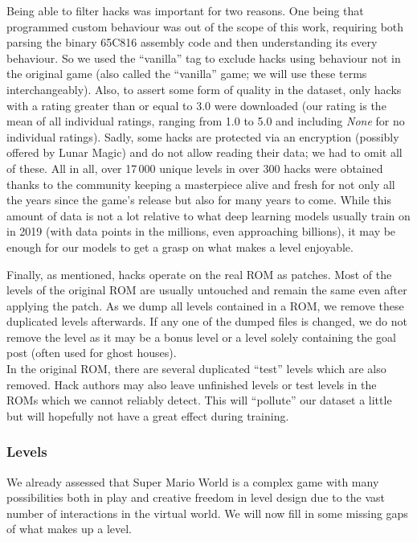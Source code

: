 Being able to filter hacks was important for two reasons. One being
that programmed custom behaviour was out of the scope of this work,
requiring both parsing the binary 65C816 assembly code and then
understanding its every behaviour. So we used the ``vanilla'' tag to
exclude hacks using behaviour not in the original game (also called
the ``vanilla'' game; we will use these terms interchangeably). Also,
to assert some form of quality in the dataset, only hacks with a
rating greater than or equal to 3.0 were downloaded (our rating is the
mean of all individual ratings, ranging from 1.0 to 5.0 and including
\emph{None} for no individual ratings). Sadly, some hacks are
protected via an encryption (possibly offered by Lunar Magic) and do
not allow reading their data; we had to omit all of these. All in all,
over 17\,000 unique levels in over 300 hacks were obtained thanks to
the community keeping a masterpiece alive and fresh for not only all
the years since the game's release but also for many years to come.
While this amount of data is not a lot relative to what deep learning
models usually train on in 2019 (with data points in the millions,
even approaching billions), it may be enough for our models to get a
grasp on what makes a level enjoyable.

Finally, as mentioned, hacks operate on the real ROM as patches. Most
of the levels of the original ROM are usually untouched and remain the
same even after applying the patch. As we dump all levels contained in
a ROM, we remove these duplicated levels afterwards. If any one of the
dumped files is changed, we do not remove the level as it may be a
bonus level or a level solely containing the goal post (often used for
ghost houses). \\
In the original ROM, there are several duplicated ``test'' levels
which are also removed. Hack authors may also leave unfinished levels
or test levels in the ROMs which we cannot reliably detect. This will
``pollute'' our dataset a little but will hopefully not have a great
effect during training.

\subsubsection{Levels}
\label{sec:levels}

We already assessed that Super Mario World is a complex game with many
possibilities both in play and creative freedom in level design due to
the vast number of interactions in the virtual world. We will now fill
in some missing gaps of what makes up a level.

